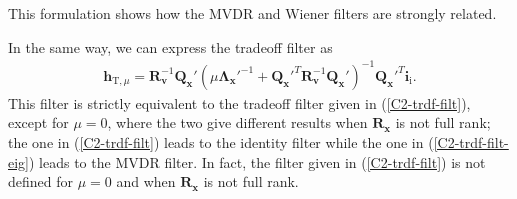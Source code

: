 \documentclass[10pt,pdflatex,headrule,landscape]{beamer}
\begin{document}
\begin{frame}[allowframebreaks]
This formulation shows how the MVDR and Wiener filters are strongly related.

In the same way, we can express the tradeoff filter as
\begin{eqnarray}
\label{C2-trdf-filt-eig}
 \mathbf{h}_{\mathrm{T},\mu} = \mathbf{R}_{\mathbf{v}}^{-1} \mathbf{Q}_{\mathbf{x}}' \left( \mu \mathbf{\Lambda}_{\mathbf{x}}'^{-1} + \mathbf{Q}_{\mathbf{x}}'^T
 \mathbf{R}_{\mathbf{v}}^{-1} \mathbf{Q}_{\mathbf{x}}' \right)^{-1} \mathbf{Q}_{\mathbf{x}}'^T \mathbf{i}_{\mathrm{i}} .
\end{eqnarray}
This filter is strictly equivalent to the tradeoff filter given in (\ref{C2-trdf-filt}), except for $\mu = 0$, where the two give different results when $\mathbf{R}_{\mathbf{x}}$ is not full rank; the one in (\ref{C2-trdf-filt}) leads to the identity filter while the one in (\ref{C2-trdf-filt-eig}) leads to the MVDR filter. In fact, the filter given in (\ref{C2-trdf-filt}) is not defined for $\mu = 0$ and when $\mathbf{R}_{\mathbf{x}}$ is not full rank.

\end{frame}
\end{document}
